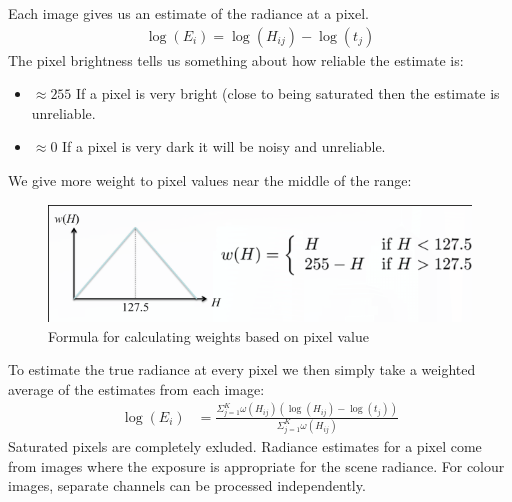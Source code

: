 \documentclass{article}
\begin{document}
Each image gives us an estimate of the radiance at a pixel.
\begin{align*}
	\log(E_i) = \log(H_{ij}) - \log(t_j)
\end{align*}
The pixel brightness tells us something about how reliable the estimate is:
\begin{itemize}
	\item $\approx 255$ If a pixel is very bright (close to being saturated then the estimate is unreliable.
	\item $\approx 0$ If a pixel is very dark it will be noisy and unreliable. 
\end{itemize}
We give more weight to pixel values near the middle of the range:
\begin{figure}[!h]
	\includegraphics [width=\textwidth]{hdrweights.png}
	\caption{Formula for calculating weights based on pixel value}
	\label{Fig:hdrweights}
\end{figure}
To estimate the true radiance at every pixel we then simply take a weighted average of the estimates from each image:
\begin{align*}
	\log(E_i) &= \frac{\Sigma^K_{j=1}\omega(H_{ij})(\log(H_{ij})-\log(t_j))}
	{\Sigma^K_{j=1}\omega(H_{ij})}
\end{align*}
Saturated pixels are completely exluded. Radiance estimates for a pixel come from images where the exposure is appropriate for the scene radiance.
For colour images, separate channels can be processed independently.
\end{document}

